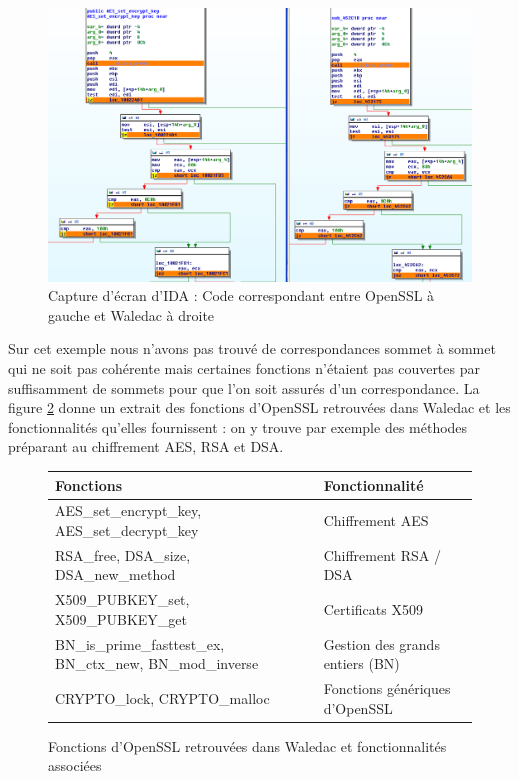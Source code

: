\begin{figure}[h]
\begin{center}
\includegraphics[width=1.0\textwidth]{supports/libs/WalSSLIDAAESgraph.png}
\caption{Capture d'écran d'IDA : Code correspondant entre OpenSSL à gauche et Waledac à droite} 
\label{fig:plugin_code_sync}
\end{center}
\end{figure}

Sur cet exemple nous n'avons pas trouvé de correspondances sommet à sommet qui ne soit pas cohérente mais certaines fonctions n'étaient pas couvertes par suffisamment de sommets pour que l'on soit assurés d'un correspondance.
La figure \ref{fig:tab_fonctionnalites_waledac_openssl} donne un extrait des fonctions d'OpenSSL retrouvées dans Waledac et les fonctionnalités qu'elles fournissent : on y trouve par exemple des méthodes préparant au chiffrement AES, RSA et DSA.

\begin{figure}[h]
\begin{tabular}{|p{9cm}|l|}
\hline
Fonctions 							& Fonctionnalité 			\\
\hline
AES\_set\_encrypt\_key, AES\_set\_decrypt\_key 			& Chiffrement AES 			\\
RSA\_free, DSA\_size, DSA\_new\_method 				& Chiffrement RSA / DSA 		\\
 X509\_PUBKEY\_set, X509\_PUBKEY\_get 				& Certificats X509 			\\
BN\_is\_prime\_fasttest\_ex, BN\_ctx\_new, BN\_mod\_inverse	& Gestion des grands entiers (BN)	\\
CRYPTO\_lock, CRYPTO\_malloc 					& Fonctions génériques d'OpenSSL 	\\
\hline
\end{tabular}
\caption{Fonctions d'OpenSSL retrouvées dans Waledac et fonctionnalités associées}
\label{fig:tab_fonctionnalites_waledac_openssl}
\end{figure}

